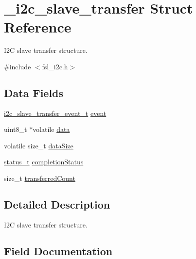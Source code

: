 \hypertarget{struct__i2c__slave__transfer}{}\section{\+\_\+i2c\+\_\+slave\+\_\+transfer Struct Reference}
\label{struct__i2c__slave__transfer}


I2C slave transfer structure.  




{\ttfamily \#include $<$fsl\+\_\+i2c.\+h$>$}

\subsection*{Data Fields}
\begin{DoxyCompactItemize}
\item 
\mbox{\hyperlink{group__i2c__driver_ga95f120f6a73af41648364538cf9a6eca}{i2c\+\_\+slave\+\_\+transfer\+\_\+event\+\_\+t}} \mbox{\hyperlink{struct__i2c__slave__transfer_ad43dfdc1308f39dd4bff91414c1cce2c}{event}}
\item 
uint8\+\_\+t $\ast$volatile \mbox{\hyperlink{struct__i2c__slave__transfer_a6df23c71c49ca7371f41136934d4fad1}{data}}
\item 
volatile size\+\_\+t \mbox{\hyperlink{struct__i2c__slave__transfer_aec81567ca73e5b0cb790098785e345c5}{data\+Size}}
\item 
\mbox{\hyperlink{group__ksdk__common_gaaabdaf7ee58ca7269bd4bf24efcde092}{status\+\_\+t}} \mbox{\hyperlink{struct__i2c__slave__transfer_aac6aa92f2aef99293ab2f5ad6f734fad}{completion\+Status}}
\item 
size\+\_\+t \mbox{\hyperlink{struct__i2c__slave__transfer_a97856cb5d71b7981d4ce9813124a5433}{transferred\+Count}}
\end{DoxyCompactItemize}


\subsection{Detailed Description}
I2C slave transfer structure. 

\subsection{Field Documentation}
\mbox{\label{struct__i2c__slave__transfer_aac6aa92f2aef99293ab2f5ad6f734fad}} 

